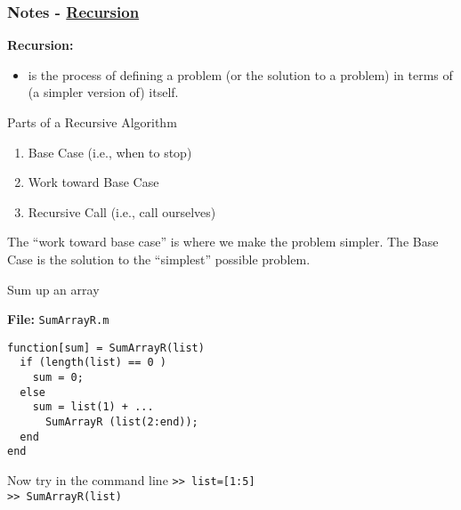 \documentclass[11pt]{beamer}
\begin{document}
\begin{frame}[fragile]
	
	\frametitle{Notes - 
		\href{http://www.mathworks.com/help/ident/ug/algorithms-for-recursive-estimation.html}{Recursion}
	}
	\vspace{-17pt}
	\begin{minipage}[t]{0.47\linewidth}
		\begin{exampleblock}{}
			\textbf{Recursion:}
			\begin{itemize}
				\item is the process of defining a problem (or the solution to a problem) in terms of (a simpler version of) itself.
			\end{itemize}
		\end{exampleblock}
		Parts of a Recursive Algorithm
		\begin{enumerate}
		\item Base Case (i.e., when to stop)
		\item Work toward Base Case
		\item Recursive Call (i.e., call ourselves)
		\end{enumerate}
		The ``work toward base case'' is where we make the problem simpler. The Base Case is the solution to the ``simplest'' possible problem. 
		\end{minipage}
	\hspace{7pt}
	\begin{minipage}[t]{0.47\linewidth}
		\begin{block}{}
			Sum up an array
		\end{block}
		\textbf{File:} \verb|SumArrayR.m|
		\begin{verbatim}
function[sum] = SumArrayR(list) 
  if (length(list) == 0 ) 
    sum = 0; 
  else 
    sum = list(1) + ...
      SumArrayR (list(2:end)); 
  end 
end 		
		\end{verbatim}			
Now try in the command line
\verb|>> list=[1:5]| \\
\verb|>> SumArrayR(list)|
	\end{minipage}
	
\end{frame}
\end{document}
